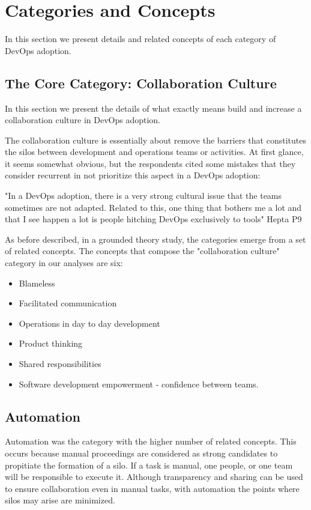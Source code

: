 \section{Categories and Concepts} \label{sec:categories_concepts}
In this section we present details and related concepts of each category of DevOps adoption.

\subsection{The Core Category: Collaboration Culture}
In this section we present the details of what exactly means build and increase a collaboration culture in DevOps adoption.

The collaboration culture is essentially about remove the barriers that constitutes the silos between development and operations teams or activities. At first glance, it seems somewhat obvious, but the respondents cited some mistakes that they consider recurrent in not prioritize this aspect in a DevOps adoption:

"In a DevOps adoption, there is a very strong cultural issue that the teams sometimes are not adapted. Related to this, one thing that bothers me a lot and that I see happen a lot is people hitching DevOps exclusively to tools" Hepta P9

As before described, in a grounded theory study, the categories emerge from a set of related concepts. The concepts that compose the "collaboration culture" category in our analyses are six:

\begin{itemize}
\item Blameless
\item Facilitated communication
\item Operations in day to day development
\item Product thinking
\item Shared responsibilities
\item Software development empowerment - confidence between teams.
\end{itemize}

\subsection{Automation} \label{ssec:automation}
Automation was the category with the higher number of related concepts. This occurs because manual proceedings are considered as strong candidates to propitiate the formation of a silo. If a task is manual, one people, or one team will be responsible to execute it. Although transparency and sharing can be used to ensure collaboration even in manual tasks, with automation the points where silos may arise are minimized.

